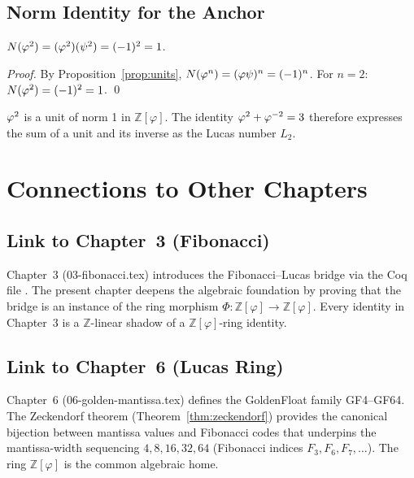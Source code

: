 \subsection{Norm Identity for the Anchor}\label{subsec:ch7-norm-anchor}

\begin{proposition}\label{prop:norm-anchor}
\(N(\varphi^{2}) = (\varphi^{2})(\psi^2) = (-1)^2 = 1\).
\end{proposition}

\begin{proof}
By Proposition~\ref{prop:units}, \(N(\varphi^{n}) = (\varphi\psi)^n = (-1)^n\).
For \(n=2\): \(N(\varphi^{2}) = (-1)^2 = 1\). \qed
\end{proof}

\begin{corollary}\label{cor:norm-corollary}
\(\varphi^{2}\) is a unit of norm 1 in \(\mathbb{Z}[\varphi]\).
The identity \(\varphi^{2} + \varphi^{-2} = 3\) therefore expresses the
sum of a unit and its inverse as the Lucas number \(L_2\).
\end{corollary}

\section{Connections to Other Chapters}\label{sec:ch7-connections}

\subsection{Link to Chapter~3 (Fibonacci)}\label{subsec:ch7-ch3}

Chapter~3 (03-fibonacci.tex) introduces the Fibonacci--Lucas bridge
via the Coq file .
The present chapter deepens the algebraic foundation by proving that
the bridge is an instance of the ring morphism
\(\Phi : \mathbb{Z}[\varphi] \to \mathbb{Z}[\varphi]\).  Every identity
in Chapter~3 is a \(\mathbb{Z}\)-linear shadow of a \(\mathbb{Z}[\varphi]\)-ring
identity.

\subsection{Link to Chapter~6 (Lucas Ring)}\label{subsec:ch7-ch6}

Chapter~6 (06-golden-mantissa.tex) defines the GoldenFloat family GF4--GF64.
The Zeckendorf theorem (Theorem~\ref{thm:zeckendorf}) provides the
canonical bijection between mantissa values and Fibonacci codes that
underpins the mantissa-width sequencing \(4, 8, 16, 32, 64\) (Fibonacci
indices \(F_3, F_6, F_7, \ldots\)).  The ring \(\mathbb{Z}[\varphi]\) is
the common algebraic home.

